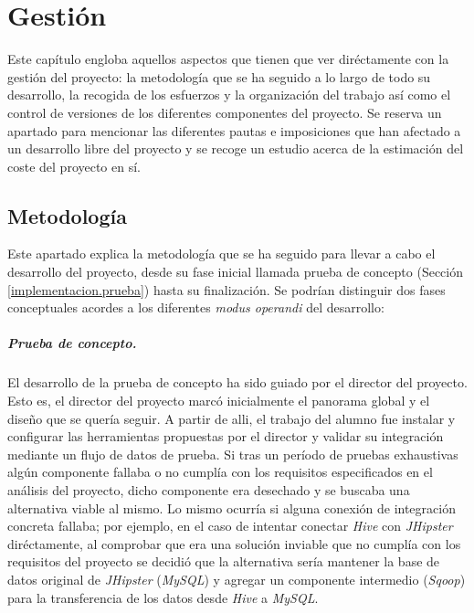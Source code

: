 \chapter{Gestión} \label{gestion}
Este capítulo engloba aquellos aspectos que tienen que ver diréctamente con la gestión del proyecto: la metodología que se ha seguido a lo largo de todo su desarrollo, la  recogida de los esfuerzos y la organización del trabajo así como el control de versiones de los diferentes componentes del proyecto. Se reserva un apartado para mencionar las diferentes pautas e imposiciones que han afectado a un desarrollo libre del proyecto y  se recoge un estudio acerca de la estimación del coste del proyecto en sí. 

\section{Metodología} \label{gestion.metodologia}
Este apartado explica la metodología que se ha seguido para llevar a cabo el desarrollo del proyecto, desde su fase inicial llamada prueba de concepto (Sección \ref{implementacion.prueba}) hasta su finalización. Se podrían distinguir dos fases conceptuales acordes a los diferentes \textit{modus operandi} del desarrollo: 
\paragraph*{Prueba de concepto.} El desarrollo de la prueba de concepto ha sido guiado por el director del proyecto. Esto es, el director del proyecto marcó inicialmente el panorama global y el diseño que se quería seguir. A partir de alli, el trabajo del alumno fue instalar y configurar las herramientas propuestas por el director y validar su integración mediante un flujo de datos de prueba. Si tras un período de pruebas exhaustivas algún componente fallaba o no cumplía con los requisitos especificados en el análisis del proyecto, dicho componente era desechado y se buscaba una alternativa viable al mismo. Lo mismo ocurría si alguna conexión de integración concreta fallaba; por ejemplo, en el caso de intentar conectar \textit{Hive} con \textit{JHipster} diréctamente, al comprobar que era una solución inviable que no cumplía con los requisitos del proyecto se decidió que la alternativa sería mantener la base de datos original de \textit{JHipster} (\textit{MySQL}) y agregar un componente intermedio (\textit{Sqoop}) para la transferencia de los datos desde \textit{Hive} a \textit{MySQL}.
